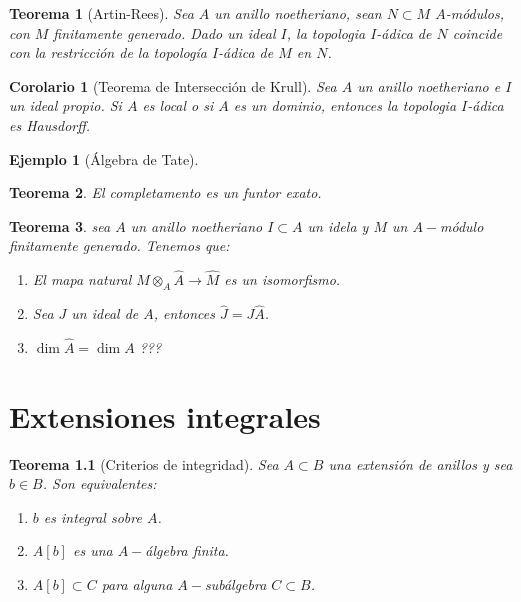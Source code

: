 \documentclass[12pt]{book}
\newtheorem{eje}{Ejemplo}
\newtheorem{teo}{Teorema}
\newtheorem{cor}{Corolario}
\begin{document}
\begin{teo}[Artin-Rees]
Sea $A$ un anillo noetheriano, sean $N \subset M$ $A$-módulos, con $M$ finitamente generado. Dado un ideal $I$, la topologia $I$-ádica de $N$ coincide con la restricción de la topología $I$-ádica de $M$ en $N$.
\end{teo}


\begin{cor}[Teorema de Intersección de Krull]
Sea $A$ un anillo noetheriano e $I$ un ideal propio. Si $A$ es local o si $A$ es un dominio, entonces la topologia $I$-ádica es Hausdorff.
\end{cor}


\begin{eje}[Álgebra de Tate]

\end{eje}

\begin{teo}
El completamento es un funtor exato. 
\end{teo}

\begin{teo}
sea $A$ un anillo noetheriano $I\subset A$ un idela y $M$ un $A-$módulo finitamente generado. Tenemos que:
\begin{enumerate}
\item El mapa natural $M\otimes _ A \hat{A} \rightarrow \hat{M}$ es un isomorfismo.
\item Sea $J$ un ideal de $A$, entonces $\hat{J} = J \hat{A}$.
\item $\dim \hat{A} =  \dim A$ ???
\end{enumerate}
\end{teo}













\chapter{Extensiones integrales}


\begin{teo}[Criterios de integridad]
	Sea $A\subset B$ una extensión de anillos y sea $b\in B$. Son equivalentes:
	\begin{enumerate}
		\item $b$ es integral sobre $A$.
		\item $A[b]$ es una $A-$álgebra finita.
		\item $A[b] \subset C$ para alguna $A-$subálgebra $C \subset B$.
	\end{enumerate}
\end{teo}
\end{document}
